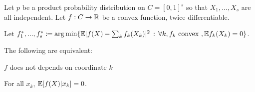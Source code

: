 \documentclass{article}
\begin{document}
 
 \begin{proposition}
Let $p$ be a product probability distribution on $C=[0,1]^s$ so that $X_1,...,X_s$ are all independent. Let $f: C \rightarrow \mathbb{R}$ be a convex function, twice differentiable. 

Let $f^*_1,...,f^*_s \coloneqq \arg\min \{ \mathbb{E} | f(X) - \sum_k f_k(X_k) |^2 \,:\, \forall k, f_k \textrm{ convex }, \mathbb{E} f_k(X_k) = 0\}$.

The following are equivalent:
\begin{packed_enum}
\item $f$ does not depends on coordinate $k$
\item For all $x_k$, $\mathbb{E}[ f(X) | x_k] = 0$.
\end{packed_enum}
\end{proposition}
\end{document}
